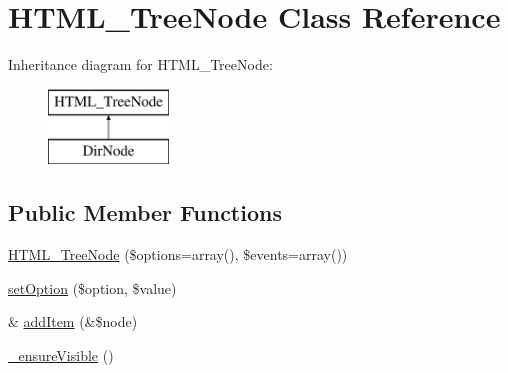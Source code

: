 \hypertarget{class_h_t_m_l___tree_node}{\section{\-H\-T\-M\-L\-\_\-\-Tree\-Node \-Class \-Reference}
\label{class_h_t_m_l___tree_node}
}
\-Inheritance diagram for \-H\-T\-M\-L\-\_\-\-Tree\-Node\-:\begin{figure}[H]
\begin{center}
\leavevmode
\includegraphics[height=2.000000cm]{class_h_t_m_l___tree_node}
\end{center}
\end{figure}
\subsection*{\-Public \-Member \-Functions}
\begin{DoxyCompactItemize}
\item 
\hyperlink{class_h_t_m_l___tree_node_a10f01c001cc3c2d6fd866e7b8c6ec8f5}{\-H\-T\-M\-L\-\_\-\-Tree\-Node} (\$options=array(), \$events=array())
\item 
\hyperlink{class_h_t_m_l___tree_node_a1eb6a860a7e2236618f8d800b9fad69d}{set\-Option} (\$option, \$value)
\item 
\& \hyperlink{class_h_t_m_l___tree_node_ab1f863fc8239851fe0b02f1af57acb93}{add\-Item} (\&\$node)
\item 
\hyperlink{class_h_t_m_l___tree_node_abe3c4f9e8d2ca685e24ed8755b70bff7}{\-\_\-ensure\-Visible} ()
\end{DoxyCompactItemize}
